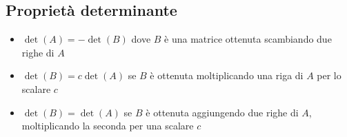 \documentclass[12pt,a4paper,oneside]{article}
\begin{document}
\subsection{Proprietà determinante}
\label{proprietàDet}

\begin{itemize}
	\item $ \det \left( A \right) = - \det \left( B \right)  $ dove $ B $ è una matrice ottenuta scambiando due righe di $ A $
	\item $ \det \left( B \right) = c \det \left( A \right)  $ se $ B $ è ottenuta moltiplicando una riga di $ A $ per lo scalare $ c $
	\item $ \det \left( B \right)  = \det\left( A \right) $ se $ B $ è ottenuta aggiungendo due righe di $ A $, moltiplicando la seconda per una scalare $ c $
	      \hr
\end{itemize}
\end{document}
